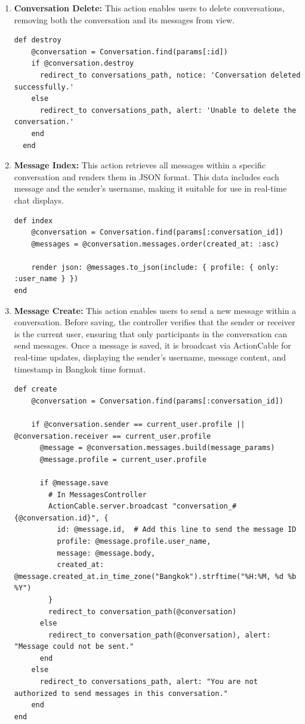 \begin{enumerate}
    \newpage
    \item \textbf{Conversation Delete:} 
    This action enables users to delete conversations, removing both the conversation and its messages from view.
    \begin{lstlisting}
def destroy
    @conversation = Conversation.find(params[:id])
    if @conversation.destroy
      redirect_to conversations_path, notice: 'Conversation deleted successfully.'
    else
      redirect_to conversations_path, alert: 'Unable to delete the conversation.'
    end
  end
    \end{lstlisting}

    
    \item \textbf{Message Index:} 
    This action retrieves all messages within a specific conversation and renders them in JSON format. This data includes each message and the sender's username, making it suitable for use in real-time chat displays.
    
    \begin{lstlisting}
def index
    @conversation = Conversation.find(params[:conversation_id])
    @messages = @conversation.messages.order(created_at: :asc)
    
    render json: @messages.to_json(include: { profile: { only: :user_name } })
end
    \end{lstlisting}

    \newpage
    \item \textbf{Message Create:} 
    This action enables users to send a new message within a conversation. Before saving, the controller verifies that the sender or receiver is the current user, ensuring that only participants in the conversation can send messages. Once a message is saved, it is broadcast via ActionCable for real-time updates, displaying the sender’s username, message content, and timestamp in Bangkok time format.
    \begin{lstlisting}
def create
    @conversation = Conversation.find(params[:conversation_id])
    
    if @conversation.sender == current_user.profile || @conversation.receiver == current_user.profile
      @message = @conversation.messages.build(message_params)
      @message.profile = current_user.profile
    
      if @message.save
        # In MessagesController
        ActionCable.server.broadcast "conversation_#{@conversation.id}", {
          id: @message.id,  # Add this line to send the message ID
          profile: @message.profile.user_name,
          message: @message.body,
          created_at: @message.created_at.in_time_zone("Bangkok").strftime("%H:%M, %d %b %Y")
        }
        redirect_to conversation_path(@conversation)
      else
        redirect_to conversation_path(@conversation), alert: "Message could not be sent."
      end
    else
      redirect_to conversations_path, alert: "You are not authorized to send messages in this conversation."
    end
end
    \end{lstlisting}


\end{enumerate}
